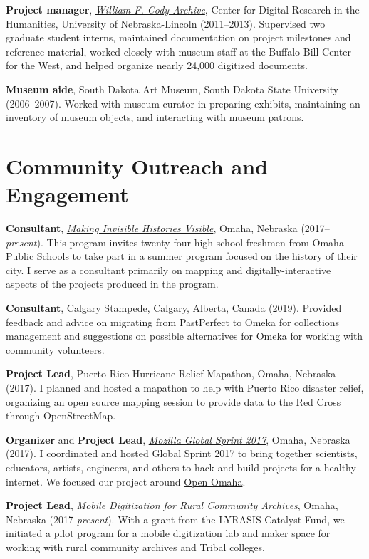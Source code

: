 \textbf{Project manager}, \emph{\href{http://codyarchive.org}{William F.
Cody Archive}}, Center for Digital Research in the Humanities,
University of Nebraska-Lincoln (2011--2013). Supervised two graduate
student interns, maintained documentation on project milestones and
reference material, worked closely with museum staff at the Buffalo Bill
Center for the West, and helped organize nearly 24,000 digitized
documents.

\textbf{Museum aide}, South Dakota Art Museum, South Dakota State
University (2006--2007). Worked with museum curator in preparing
exhibits, maintaining an inventory of museum objects, and interacting
with museum patrons.

\section{Community Outreach and
Engagement}\label{community-outreach-and-engagement}

\textbf{Consultant}, \emph{\href{http://invisiblehistory.ops.org}{Making
Invisible Histories Visible}}, Omaha, Nebraska (2017--\emph{present}).
This program invites twenty-four high school freshmen from Omaha Public
Schools to take part in a summer program focused on the history of their
city. I serve as a consultant primarily on mapping and
digitally-interactive aspects of the projects produced in the program.

\textbf{Consultant}, Calgary Stampede, Calgary, Alberta, Canada (2019).
Provided feedback and advice on migrating from PastPerfect to Omeka for
collections management and suggestions on possible alternatives for
Omeka for working with community volunteers.

\textbf{Project Lead}, Puerto Rico Hurricane Relief Mapathon, Omaha,
Nebraska (2017). I planned and hosted a mapathon to help with Puerto
Rico disaster relief, organizing an open source mapping session to
provide data to the Red Cross through OpenStreetMap.

\textbf{Organizer} and \textbf{Project Lead},
\emph{\href{https://mozilla.github.io/global-sprint/}{Mozilla Global
Sprint 2017}}, Omaha, Nebraska (2017). I coordinated and hosted Global
Sprint 2017 to bring together scientists, educators, artists, engineers,
and others to hack and build projects for a healthy internet. We focused
our project around \href{http://github.com/open-omaha/}{Open Omaha}.

\textbf{Project Lead}, \emph{Mobile Digitization for Rural Community
Archives}, Omaha, Nebraska (2017-\emph{present}). With a grant from the
LYRASIS Catalyst Fund, we initiated a pilot program for a mobile
digitization lab and maker space for working with rural community
archives and Tribal colleges.

